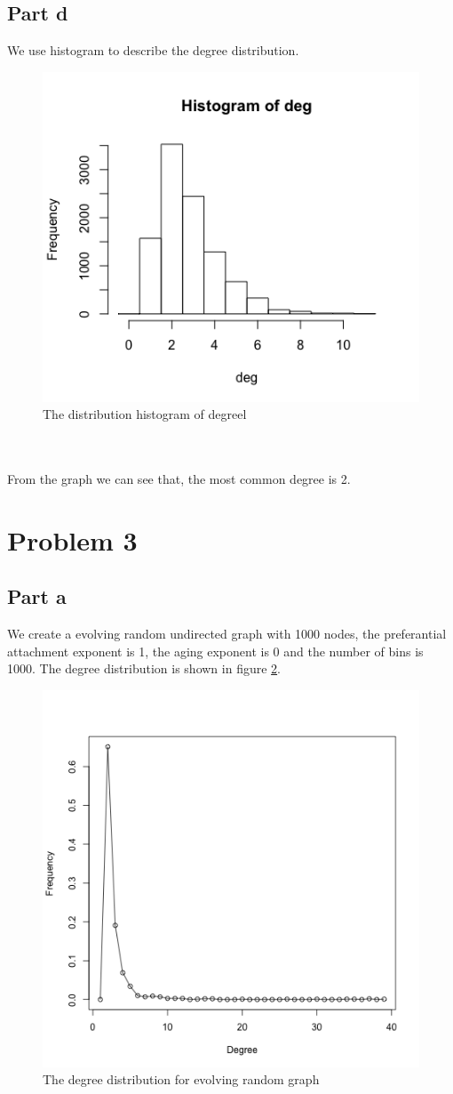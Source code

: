 \documentclass{article}
\begin{document}
\subsection{Part d}
We use histogram to describe the degree distribution.\\
\begin{figure}[htbp]
\centering
\includegraphics[width=.6\textwidth]{figure2d.png}
\caption{The distribution histogram of degreel}
\label{fig:sp_hist}
\end{figure}
\\
\\
From the graph we can see that, the most common degree is 2.
\section{Problem 3}
\subsection{Part a}
We create a evolving random undirected graph with 1000 nodes, the preferantial attachment exponent is 1, the aging exponent is 0 and the number of bins is 1000. The degree distribution is shown in figure \ref{fig:p3_1}.
\begin{figure}[htbp]
\centering
\includegraphics[width=.6\textwidth]{p3_1.png}
\caption{The degree distribution for evolving random graph}
\label{fig:p3_1}
\end{figure}
\end{document}
